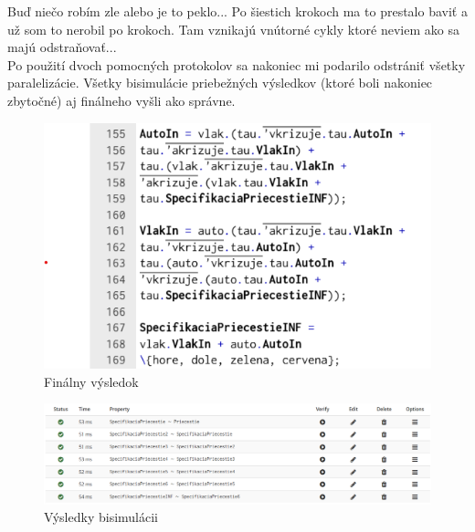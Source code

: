 \documentclass[a4paper]{article}
\begin{document}
Buď niečo robím zle alebo je to peklo... Po šiestich krokoch ma to prestalo baviť a už som to nerobil po krokoch. Tam vznikajú vnútorné cykly ktoré neviem ako sa majú odstraňovať... 
\\

Po použití dvoch pomocných protokolov sa nakoniec mi podarilo odstrániť všetky paralelizácie. Všetky bisimulácie priebežných výsledkov (ktoré boli nakoniec zbytočné) aj finálneho vyšli ako správne.  

\begin{figure}[!h]
	\centering
	\includegraphics[width=1\textwidth]{priecestie2.png}
	\caption{Finálny výsledok}
\end{figure}


\begin{figure}[!h]
	\centering
	\includegraphics[width=1\textwidth]{bisim2.png}
	\caption{Výsledky bisimulácii}
\end{figure}
\end{document}
